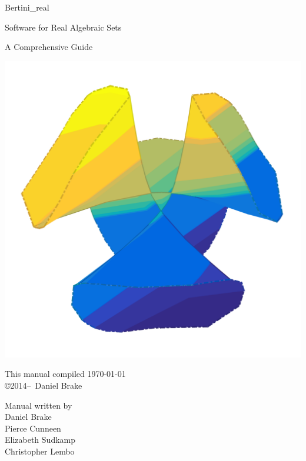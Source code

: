 \documentclass[10pt]{article}
\begin{document}
\pagestyle{plain} 

	\setcounter{page}{1}


\begin{titlepage}

	\begin{center}
	\vspace{2cm}
	{\Large Bertini\_real}

\vspace{\baselineskip}
	{\large Software for Real Algebraic Sets}



	{\large A Comprehensive Guide}	

	\vspace{3cm}
	\includegraphics[width=0.75\linewidth]{CayleyCubic}
	\end{center}

	\vfill

	\begin{minipage}{\linewidth}

	\begin{minipage}{0.4\linewidth}
	\centering
	This manual compiled \today \\
	\copyright 2014--\the\year\ Daniel Brake
	\end{minipage}
	\hfill
	\begin{minipage}{0.4\linewidth}
	\centering Manual written by \vspace{\baselineskip}
	\\  Daniel Brake \\ Pierce Cunneen \\ Elizabeth Sudkamp \\ Christopher Lembo
	\end{minipage}

	\end{minipage}

	

\end{titlepage}
\end{document}

